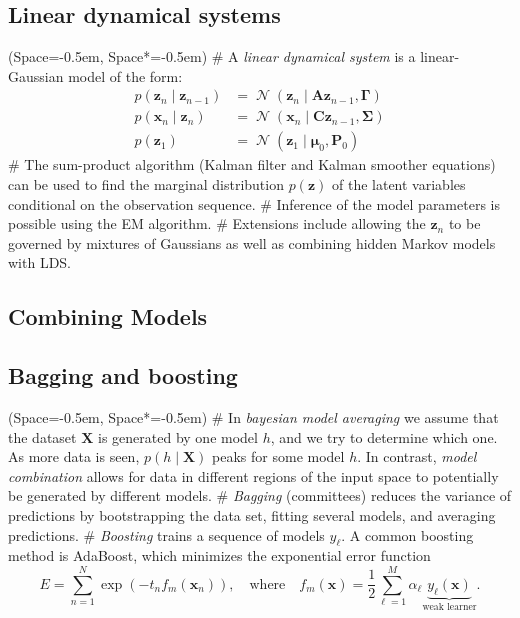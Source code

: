 \documentclass[12pt, a4paper]{article}
\newcommand{\listSpace}{-0.5em}%
\newcommand{\vect}[1]{\bm{#1}}
\DeclareMathOperator{\N}{\mathcal{N}}
\begin{document}
\subsection*{Linear dynamical systems}


\begin{easylist}[itemize]
	\ListProperties(Space=\listSpace, Space*=\listSpace)
	# A \emph{linear dynamical system} is a linear-Gaussian model of the form:
	\begin{align*}
		p(\vect{z}_n \mid \vect{z}_{n-1}) &= 
		\N \left( \vect{z}_n \mid \vect{A} \vect{z}_{n-1}, \vect{\Gamma}  \right) \tag{transitions} \\ 
		p(\vect{x}_n \mid \vect{z}_{n}) &= 
		\N \left( \vect{x}_n \mid \vect{C} \vect{z}_{n-1}, \vect{\Sigma}  \right) \tag{emissions} \\
		p(\vect{z}_1) &= 
		\N \left( \vect{z}_1 \mid \vect{\mu}_0 , \vect{P}_0  \right) \tag{initial value}
	\end{align*}
	# The sum-product algorithm (Kalman filter and Kalman smoother equations) can be used to find the marginal distribution $p(\vect{z})$ of the latent variables conditional on the observation sequence.
	# Inference of the model parameters is possible using the EM algorithm.
	# Extensions include allowing the $\vect{z}_n$ to be governed by mixtures of Gaussians as well as combining hidden Markov models with LDS.
\end{easylist}

\subsection{Combining Models}
\subsection*{Bagging and boosting}
\begin{easylist}[itemize]
	\ListProperties(Space=\listSpace, Space*=\listSpace)
	# In \emph{bayesian model averaging} we assume that the dataset $\vect{X}$ is generated by one model $h$, and we try to determine which one.
	As more data is seen, $p(h \mid \vect{X})$ peaks for some model $h$. 
	\newline
	In contrast, \emph{model combination} allows for data in different regions of the input space to potentially be generated by different models.
	# \emph{Bagging} (committees) reduces the variance of predictions by bootstrapping the data set, fitting several models, and averaging predictions.
	# \emph{Boosting} trains a sequence of models ${y_\ell}$.
	A common boosting method is AdaBoost, which minimizes the exponential error function
	\begin{equation*}
		E = \sum_{n=1}^{N} \exp \left( -t_n f_m(\vect{x}_n) \right),
		\quad
		\text{where}
		\quad
		f_m(\vect{x}) = \frac{1}{2} \sum_{\ell = 1}^{M}
		\alpha_\ell \underbrace{y_\ell (\vect{x})}_\text{weak learner}.
	\end{equation*}
\end{easylist}
\end{document}
